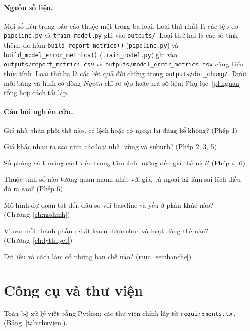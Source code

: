 \paragraph{Nguồn số liệu.} Mọi số liệu trong báo cáo thuộc một trong ba loại. Loại thứ nhất là các tệp do \texttt{pipeline.py} và \texttt{train\_model.py} ghi vào \texttt{outputs/}. Loại thứ hai là các số tính thêm, do hàm \texttt{build\_report\_metrics()} (\texttt{pipeline.py}) và \texttt{build\_model\_error\_metrics()} (\texttt{train\_model.py}) ghi vào \texttt{outputs/report\_metrics.csv} và \texttt{outputs/model\_error\_metrics.csv} cùng biểu thức tính. Loại thứ ba là các kết quả đối chứng trong \texttt{outputs/doi\_chung/}. Dưới mỗi bảng và hình có dòng \emph{Nguồn} chỉ rõ tệp hoặc mã số liệu; Phụ lục~\ref{pl:nguon} tổng hợp cách tái lập.

\paragraph{Câu hỏi nghiên cứu.}
\begin{description}[leftmargin=2.2em,style=sameline,nosep]
  \item[Q1] Giá nhà phân phối thế nào, có lệch hoặc có ngoại lai đáng kể không? (Phép 1)
  \item[Q2] Giá khác nhau ra sao giữa các loại nhà, vùng và suburb? (Phép 2, 3, 5)
  \item[Q3] Số phòng và khoảng cách đến trung tâm ảnh hưởng đến giá thế nào? (Phép 4, 6)
  \item[Q4] Thuộc tính số nào tương quan mạnh nhất với giá, và ngoại lai làm sai lệch điều đó ra sao? (Phép 6)
  \item[Q5] Mô hình dự đoán tốt đến đâu so với baseline và yếu ở phân khúc nào? (Chương~\ref{ch:mohinh})
  \item[Q6] Vì sao mỗi thành phần scikit-learn được chọn và hoạt động thế nào? (Chương~\ref{ch:lythuyet})
  \item[Q7] Dữ liệu và cách làm có những hạn chế nào? (mục~\ref{sec:hanche})
\end{description}

\section{Công cụ và thư viện}
Toàn bộ xử lý viết bằng Python; các thư viện chính lấy từ \texttt{requirements.txt} (Bảng~\ref{tab:thuvien}).


